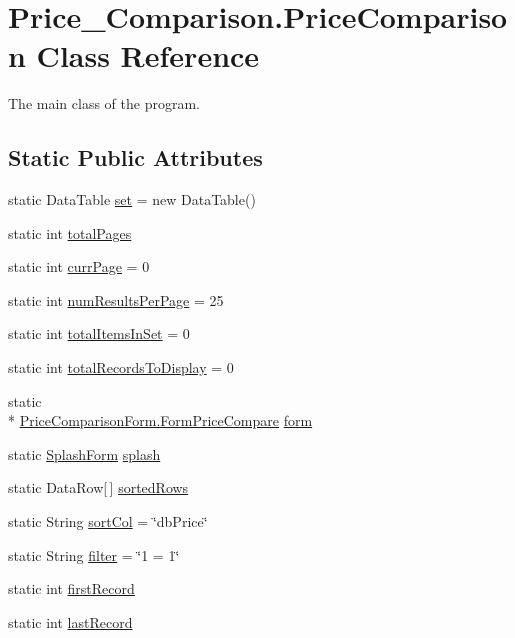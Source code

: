 \hypertarget{class_price___comparison_1_1_price_comparison}{\section{Price\-\_\-\-Comparison.\-Price\-Comparison Class Reference}
\label{class_price___comparison_1_1_price_comparison}
}


The main class of the program.  


\subsection*{Static Public Attributes}
\begin{DoxyCompactItemize}
\item 
static Data\-Table \hyperlink{class_price___comparison_1_1_price_comparison_a3d6993277a69f5816e84ceb7aa2a69c0}{set} = new Data\-Table()
\item 
static int \hyperlink{class_price___comparison_1_1_price_comparison_a61b472a9b894cc9f6124cd8450688436}{total\-Pages}
\item 
static int \hyperlink{class_price___comparison_1_1_price_comparison_a36b71cb32784ebb0101e4281f0cb211f}{curr\-Page} = 0
\item 
static int \hyperlink{class_price___comparison_1_1_price_comparison_a03ce8e6d675cf14e9f3ab91015559ae5}{num\-Results\-Per\-Page} = 25
\item 
static int \hyperlink{class_price___comparison_1_1_price_comparison_a1ed3ccdec43ddc79d7d77bb7a8b9657c}{total\-Items\-In\-Set} = 0
\item 
static int \hyperlink{class_price___comparison_1_1_price_comparison_a9e1cc855ebfb83f7acacebd5b50af064}{total\-Records\-To\-Display} = 0
\item 
static \\*
\hyperlink{class_price_comparison_form_1_1_form_price_compare}{Price\-Comparison\-Form.\-Form\-Price\-Compare} \hyperlink{class_price___comparison_1_1_price_comparison_a59d01fc0b61a9d6d4e869663f2b39f78}{form}
\item 
static \hyperlink{class_price___comparison_1_1_splash_form}{Splash\-Form} \hyperlink{class_price___comparison_1_1_price_comparison_a5c27abcda5ec2f037b329583a365e060}{splash}
\item 
static Data\-Row\mbox{[}$\,$\mbox{]} \hyperlink{class_price___comparison_1_1_price_comparison_adc440c55ac225fc7bcf5192a3966638f}{sorted\-Rows}
\item 
static String \hyperlink{class_price___comparison_1_1_price_comparison_a8b976f4f4e8b0a3d60f88ac7d799abec}{sort\-Col} = \char`\"{}db\-Price\char`\"{}
\item 
static String \hyperlink{class_price___comparison_1_1_price_comparison_a358772462e797f3672e8d5b6113a82d7}{filter} = \char`\"{}1 = 1\char`\"{}
\item 
static int \hyperlink{class_price___comparison_1_1_price_comparison_a52d476d2b6219286b1a8ff308284e95e}{first\-Record}
\item 
static int \hyperlink{class_price___comparison_1_1_price_comparison_a7cbb85e5ca4e62a1f47c3b5dfa9e2659}{last\-Record}
\end{DoxyCompactItemize}
